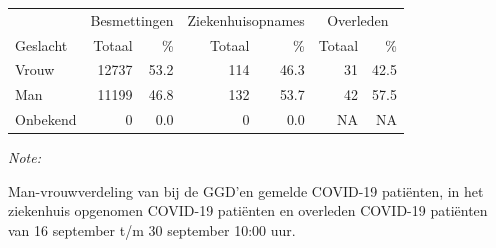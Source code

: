 \documentclass[
  english,
  man,floatsintext]{apa6}
\begin{document}
\begin{table}
\centering\begingroup\fontsize{11}{13}\selectfont

\begin{threeparttable}
\begin{tabular}{lrrrrrr}
\toprule
\multicolumn{1}{c}{ } & \multicolumn{2}{c}{Besmettingen} & \multicolumn{2}{c}{Ziekenhuisopnames} & \multicolumn{2}{c}{Overleden} \\
\cmidrule(l{3pt}r{3pt}){2-3} \cmidrule(l{3pt}r{3pt}){4-5} \cmidrule(l{3pt}r{3pt}){6-7}
Geslacht & Totaal & \% & Totaal & \% & Totaal & \%\\
\midrule
Vrouw & 12737 & 53.2 & 114 & 46.3 & 31 & 42.5\\
Man & 11199 & 46.8 & 132 & 53.7 & 42 & 57.5\\
Onbekend & 0 & 0.0 & 0 & 0.0 & NA & NA\\
\bottomrule
\end{tabular}
\begin{tablenotes}
\item \textit{Note: } 
\item Man-vrouwverdeling van bij de GGD’en gemelde COVID-19 patiënten, in het ziekenhuis opgenomen COVID-19 patiënten en overleden COVID-19 patiënten van 16 september t/m 30 september 10:00 uur.
\end{tablenotes}
\end{threeparttable}
\endgroup{}
\end{table}
\newpage
\end{document}
